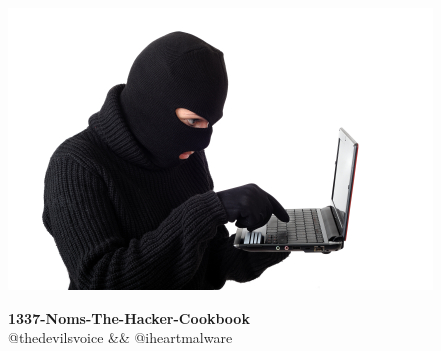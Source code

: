 \begin{titlepage}
	\centering
	\vspace{0mm}
	\includegraphics{images/hacked.jpg}
	\vspace*{40mm} %
	\begin{flushright}
		\textbf{\Huge {1337-Noms-The-Hacker-Cookbook}}\\
		\vspace{5mm}
		\Large \textsf{@thedevilsvoice \&\& @iheartmalware}\\
		\vspace*{0mm}
	\end{flushright}
	\clearpage
	\vspace*{\fill}
\end{titlepage}